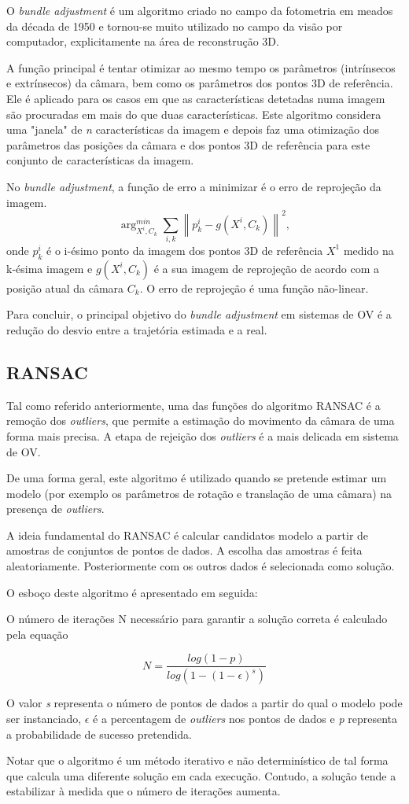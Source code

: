 O \textit{bundle adjustment} é um algoritmo criado no campo da fotometria em meados da década de 1950 e tornou-se muito utilizado no campo da visão por computador, explicitamente na área de reconstrução 3D.

A função principal é tentar otimizar ao mesmo tempo os parâmetros (intrínsecos e extrínsecos) da câmara, bem como os parâmetros dos pontos 3D de referência. Ele é aplicado para os casos em que as características detetadas numa imagem são procuradas em mais do que duas características. Este algoritmo considera uma "janela" de \textit{n} características da imagem e depois faz uma otimização dos parâmetros das posições da câmara e dos pontos 3D de referência para este conjunto de características da imagem.

No \textit{bundle adjustment}, a função de erro a minimizar é o erro de reprojeção da imagem. 
\[ \arg_{X^i,C_k}^{min} \sum_{i,k}{\left \| p_k^i - g(X^i ,C_k) \right \|}^2 ,\]
onde $p_k^i$ é o i-ésimo ponto da imagem dos pontos 3D de referência \textit{$X^1$} medido na k-ésima imagem e $\textit{g}(X^i,C_k)$ é a sua imagem de reprojeção de acordo com a posição atual da câmara $C_k$. O erro de reprojeção é uma função não-linear.

Para concluir, o principal objetivo do \textit{bundle adjustment} em sistemas de OV é a redução do desvio entre a trajetória estimada e a real.

\subsection{RANSAC}


Tal como referido anteriormente, uma das funções do algoritmo RANSAC é a remoção dos \textit{outliers}, que permite a estimação do movimento da câmara de uma forma mais precisa. A etapa de rejeição dos \textit{outliers} é a mais delicada em sistema de OV.

De uma forma geral, este algoritmo é utilizado quando se pretende estimar um modelo (por exemplo os parâmetros de rotação e translação de uma câmara) na presença de \textit{outliers}.

A ideia fundamental do RANSAC é calcular candidatos modelo a partir de amostras de conjuntos de pontos de dados. A escolha das amostras é feita aleatoriamente. Posteriormente com os outros dados é selecionada como solução.

O esboço deste algoritmo é apresentado em seguida:


O número de iterações N necessário para garantir a solução correta é calculado pela equação

\[  N = \frac{log(1-p)}{log(1-(1-\epsilon)^s)} \]

O valor \textit{s} representa o número de pontos de dados a partir do qual o modelo pode ser instanciado, $\epsilon$ é a percentagem de \textit{outliers} nos pontos de dados e \textit{p} representa a probabilidade de sucesso pretendida.

Notar que o algoritmo é um método iterativo e não determinístico de tal forma que calcula uma diferente solução em cada execução. Contudo, a solução tende a estabilizar à medida que o número de iterações aumenta.